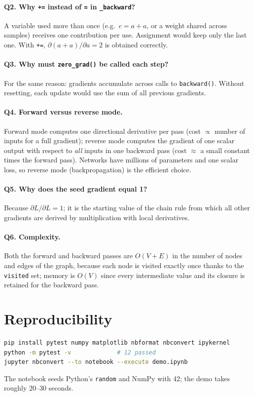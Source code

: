 \documentclass[11pt,a4paper]{article}
\begin{document}
\paragraph{Q2. Why \texttt{+=} instead of \texttt{=} in \texttt{\_backward}?}
A variable used more than once (e.g.\ $c=a+a$, or a weight shared across samples) receives one contribution per use. Assignment would keep only the last one. With \texttt{+=}, $\partial(a+a)/\partial a=2$ is obtained correctly.

\paragraph{Q3. Why must \texttt{zero\_grad()} be called each step?}
For the same reason: gradients accumulate across calls to \texttt{backward()}. Without resetting, each update would use the sum of all previous gradients.

\paragraph{Q4. Forward versus reverse mode.}
Forward mode computes one directional derivative per pass (cost $\propto$ number of inputs for a full gradient); reverse mode computes the gradient of one scalar output with respect to \emph{all} inputs in one backward pass (cost $\approx$ a small constant times the forward pass). Networks have millions of parameters and one scalar loss, so reverse mode (backpropagation) is the efficient choice.

\paragraph{Q5. Why does the seed gradient equal 1?}
Because $\partial L/\partial L=1$; it is the starting value of the chain rule from which all other gradients are derived by multiplication with local derivatives.

\paragraph{Q6. Complexity.}
Both the forward and backward passes are $O(V+E)$ in the number of nodes and edges of the graph, because each node is visited exactly once thanks to the \texttt{visited} set; memory is $O(V)$ since every intermediate value and its closure is retained for the backward pass.

\section{Reproducibility}
\begin{lstlisting}[language=bash]
pip install pytest numpy matplotlib nbformat nbconvert ipykernel
python -m pytest -v             # 12 passed
jupyter nbconvert --to notebook --execute demo.ipynb
\end{lstlisting}
The notebook seeds Python's \texttt{random} and NumPy with 42; the demo takes roughly 20--30 seconds.
\end{document}
